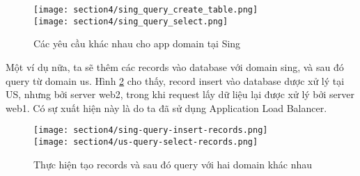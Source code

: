 \begin{figure}
    \centering
    \texttt{[image: section4/sing\_query\_create\_table.png]} \\
    \texttt{[image: section4/sing\_query\_select.png]}
    \caption{Các yêu cầu khác nhau cho app domain tại Sing}
    \label{fig:sing-query}
\end{figure}

Một ví dụ nữa, ta sẽ thêm các records vào database với domain sing, và sau đó query từ domain us. Hình \ref{fig:sing-us-records} cho thấy, record insert vào database dược xử lý tại US, nhưng bởi server web2, trong khi request lấy dữ liệu lại được xử lý bởi server web1. Có sự xuất hiện này là do ta đã sử dụng Application Load Balancer.

\begin{figure}
    \centering
    \texttt{[image: section4/sing-query-insert-records.png]} \\
    \texttt{[image: section4/us-query-select-records.png]}
    \caption{Thực hiện tạo records và sau đó query với hai domain khác nhau}
    \label{fig:sing-us-records}
\end{figure}